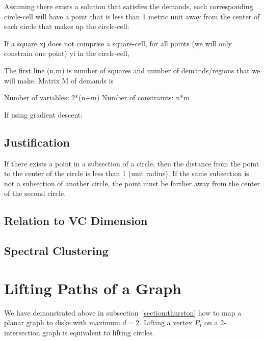 \documentclass{NSF}
\begin{document}
\begin{figure}[ht]
\caption{
}
\label{fig:convex-opt}
\end{figure}

Assuming there exists a solution that satisfies the demands, each corresponding circle-cell will have a point that is less than 1 metric unit away from the center of each circle that makes up the circle-cell:

If a square xj does not comprise a square-cell, for all points (we will only constrain one point) yi in the circle-cell,


The first line (n,m) is number of squares and number of demands/regions that we will make.
Matrix M of demands is 


Number of variables: 2*(n+m)
Number of constraints: n*m

If using gradient descent:


\subsection{Justification}
If there exists a point in a subsection of a circle, then the distance from the point to the center of the circle is less than 1 (unit radius). If the same subsection is not a subsection of another circle, the point must be farther away from the center of the second circle.

\subsection{Relation to VC Dimension}

\subsection{Spectral Clustering}

\section{Lifting Paths of a Graph}
We have demonstrated above in subsection~\ref{section:thurston} how to map a planar graph to disks with maximum $d=2$. Lifting a vertex $P_1$ on a 2-intersection graph is  equivalent to lifting circles.
\end{document}
